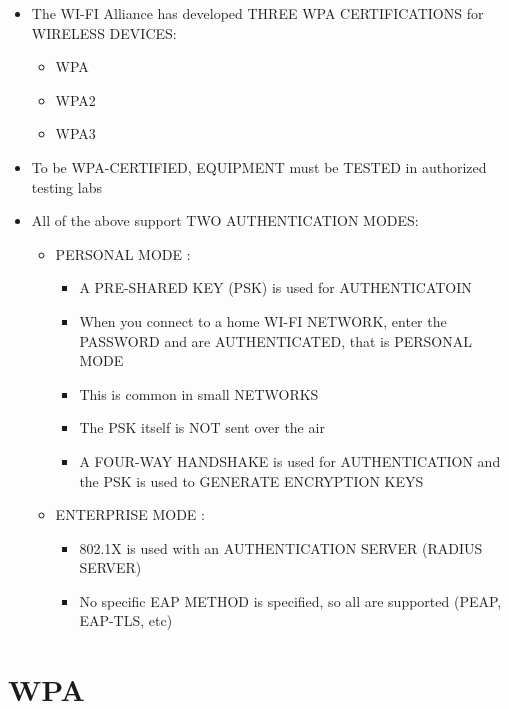 \begin{itemize}
\tightlist
\item
  The WI-FI Alliance has developed THREE WPA CERTIFICATIONS for WIRELESS
  DEVICES:

  \begin{itemize}
  \tightlist
  \item
    WPA
  \item
    WPA2
  \item
    WPA3
  \end{itemize}
\item
  To be WPA-CERTIFIED, EQUIPMENT must be TESTED in authorized testing
  labs
\item
  All of the above support TWO AUTHENTICATION MODES:

  \begin{itemize}
  \tightlist
  \item
    PERSONAL MODE :

    \begin{itemize}
    \tightlist
    \item
      A PRE-SHARED KEY (PSK) is used for AUTHENTICATOIN
    \item
      When you connect to a home WI-FI NETWORK, enter the PASSWORD and
      are AUTHENTICATED, that is PERSONAL MODE
    \item
      This is common in small NETWORKS
    \item
      The PSK itself is NOT sent over the air
    \item
      A FOUR-WAY HANDSHAKE is used for AUTHENTICATION and the PSK is
      used to GENERATE ENCRYPTION KEYS
    \end{itemize}
  \item
    ENTERPRISE MODE :

    \begin{itemize}
    \tightlist
    \item
      802.1X is used with an AUTHENTICATION SERVER (RADIUS SERVER)
    \item
      No specific EAP METHOD is specified, so all are supported (PEAP,
      EAP-TLS, etc)
    \end{itemize}
  \end{itemize}
\end{itemize}

\section{WPA}\label{wpa}

